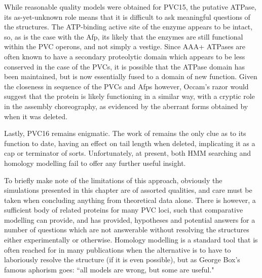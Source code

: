 While reasonable quality models were obtained for PVC15, the putative ATPase, its as-yet-unknown role means that it is difficult to ask meaningful questions of the structures. The ATP-binding active site of the enzyme appears to be intact, so, as is the case with the Afp, its likely that the enzymes are still functional within the PVC operons, and not simply a vestige. Since AAA+ ATPases are often known to have a secondary proteolytic domain which appears to be less conserved in the case of the PVCs, it is possible that the ATPase domain has been maintained, but is now essentially fused to a domain of new function. Given the closeness in sequence of the PVCs and Afps however, Occam's razor would suggest that the protein is likely functioning in a similar way, with a cryptic role in the assembly choreography, as evidenced by the aberrant forms obtained by \cite{Hurst2004} when it was deleted.

Lastly, PVC16 remains enigmatic. The work of \cite{Rybakova2015} remains the only clue as to its function to date, having an effect on tail length when deleted, implicating it as a cap or terminator of sorts. Unfortunately, at present, both HMM searching and homology modelling fail to offer any further useful insight.

To briefly make note of the limitations of this approach, obviously the simulations presented in this chapter are of assorted qualities, and care must be taken when concluding anything from theoretical data alone. There is however, a sufficient body of related proteins for many PVC loci, such that comparative modelling can provide, and has provided, hypotheses and potential answers for a number of questions which are not answerable without resolving the structures either experimentally or otherwise. Homology modelling is a standard tool that is often reached for in many publications when the alternative is to have to laboriously resolve the structure (if it is even possible), but as George Box's famous aphorism goes: ``all models are wrong, but some are useful."

